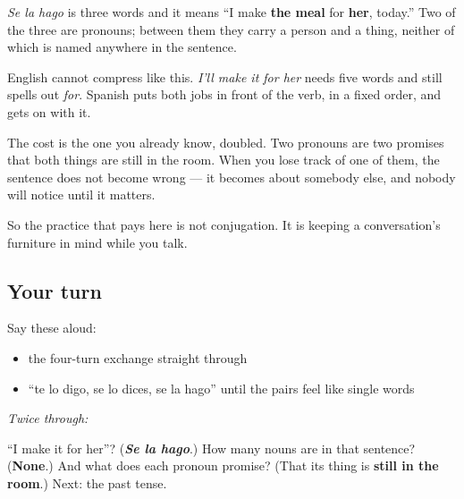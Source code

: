 \begin{grammarlens}[title={Grammar Lens: two words carrying a whole sentence}]
\emph{Se la hago} is three words and it means \textquotedblleft{}I make \textbf{the meal} for \textbf{her}, today.\textquotedblright{} Two of the three are pronouns; between them they carry a person and a thing, neither of which is named anywhere in the sentence.

English cannot compress like this. \emph{I'll make it for her} needs five words and still spells out \emph{for}. Spanish puts both jobs in front of the verb, in a fixed order, and gets on with it.

The cost is the one you already know, doubled. Two pronouns are two promises that both things are still in the room. When you lose track of one of them, the sentence does not become wrong — it becomes about somebody else, and nobody will notice until it matters.

So the practice that pays here is not conjugation. It is keeping a conversation's furniture in mind while you talk.
\end{grammarlens}

\subsection*{Your turn}
Say these aloud:

\begin{itemize}
\raggedright
  \item the four-turn exchange straight through
  \item \textquotedblleft{}te lo digo, se lo dices, se la hago\textquotedblright{} until the pairs feel like single words
\end{itemize}

\emph{Twice through:}

\begin{tcolorbox}[breakable,colback=teal!4,colframe=teal!35!black,title={Before you move on}]
\textquotedblleft{}I make it for her\textquotedblright{}? (\emph{\textbf{Se la hago}}.) How many nouns are in that sentence? (\textbf{None}.) And what does each pronoun promise? (That its thing is \textbf{still in the room}.) Next: the past tense.
\end{tcolorbox}
